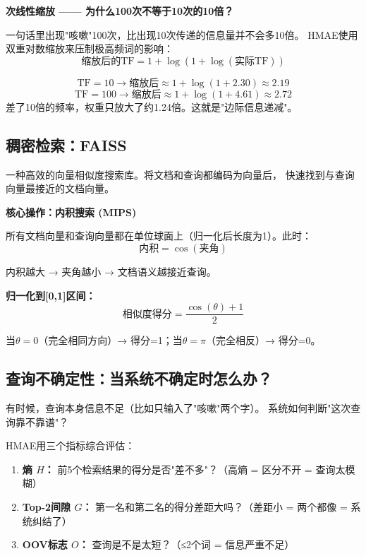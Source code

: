 \documentclass[11pt,a4paper]{ctexart}
\begin{document}
\textbf{次线性缩放 —— 为什么100次不等于10次的10倍？}

一句话里出现"咳嗽"100次，比出现10次传递的信息量并不会多10倍。
HMAE使用双重对数缩放来压制极高频词的影响：
$$\text{缩放后的TF} = 1 + \log(1 + \log(\text{实际TF}))$$

\begin{exambox}[例子]
$$\text{TF}=10 \rightarrow \text{缩放后} \approx 1 + \log(1 + 2.30) \approx 2.19$$
$$\text{TF}=100 \rightarrow \text{缩放后} \approx 1 + \log(1 + 4.61) \approx 2.72$$
差了10倍的频率，权重只放大了约1.24倍。这就是"边际信息递减"。
\end{exambox}

\subsection{稠密检索：FAISS}

\begin{defbox}
一种高效的向量相似度搜索库。将文档和查询都编码为向量后，
快速找到与查询向量最接近的文档向量。
\end{defbox}

\textbf{核心操作：内积搜索 (MIPS)}

所有文档向量和查询向量都在单位球面上（归一化后长度为1）。此时：
$$\text{内积} = \cos(\text{夹角})$$

内积越大 → 夹角越小 → 文档语义越接近查询。

\textbf{归一化到[0,1]区间：}
$$\text{相似度得分} = \frac{\cos(\theta) + 1}{2}$$

当$\theta=0$（完全相同方向）→ 得分=1；当$\theta=\pi$（完全相反）→ 得分=0。

\subsection{查询不确定性：当系统不确定时怎么办？}

有时候，查询本身信息不足（比如只输入了"咳嗽"两个字）。
系统如何判断"这次查询靠不靠谱"？

HMAE用三个指标综合评估：

\begin{enumerate}[nosep]
\item \textbf{熵 $H$：} 前5个检索结果的得分是否"差不多"？（高熵 = 区分不开 = 查询太模糊）
\item \textbf{Top-2间隙 $G$：} 第一名和第二名的得分差距大吗？（差距小 = 两个都像 = 系统纠结了）
\item \textbf{OOV标志 $O$：} 查询是不是太短？（≤2个词 = 信息严重不足）
\end{enumerate}
\end{document}

